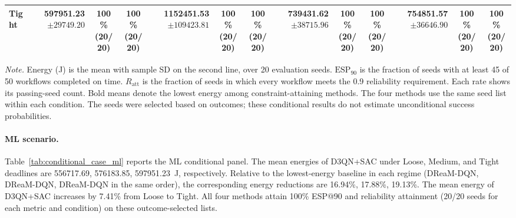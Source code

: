 \documentclass[10pt]{article}
\begin{document}
\begin{table}[!htbp]
\begin{tabular}{@{}l*{4}{rcc}@{}}
Tight & \shortstack[r]{\textbf{597951.23}\\$\pm 29749.20$} & \shortstack[c]{100\%\\(20/20)} & \shortstack[c]{100\%\\(20/20)} & \shortstack[r]{1152451.53\\$\pm 109423.81$} & \shortstack[c]{100\%\\(20/20)} & \shortstack[c]{100\%\\(20/20)} & \shortstack[r]{739431.62\\$\pm 38715.96$} & \shortstack[c]{100\%\\(20/20)} & \shortstack[c]{100\%\\(20/20)} & \shortstack[r]{754851.57\\$\pm 36646.90$} & \shortstack[c]{100\%\\(20/20)} & \shortstack[c]{100\%\\(20/20)} \\
\bottomrule
\end{tabular}
\par\vspace{3pt}
\parbox{\textwidth}{\footnotesize
\textit{Note.} Energy (J) is the mean with sample SD on the second line, over 20 evaluation seeds.
$\mathrm{ESP}_{90}$ is the fraction of seeds with at least 45 of 50 workflows completed on time.
$R_{\mathrm{att}}$ is the fraction of seeds in which every workflow meets the 0.9 reliability requirement.
Each rate shows its passing-seed count. Bold means denote the lowest energy among constraint-attaining methods.
The four methods use the same seed list within each condition.
The seeds were selected based on outcomes; these conditional results do not estimate unconditional success probabilities.}
\endgroup
\end{table}

\paragraph{ML scenario.}
Table~\ref{tab:conditional_case_ml} reports the ML conditional panel. The mean energies of D3QN+SAC under Loose, Medium, and Tight deadlines are 556717.69, 576183.85, 597951.23~J, respectively. Relative to the lowest-energy baseline in each regime (DReaM-DQN, DReaM-DQN, DReaM-DQN in the same order), the corresponding energy reductions are 16.94\%, 17.88\%, 19.13\%. The mean energy of D3QN+SAC increases by 7.41\% from Loose to Tight. All four methods attain 100\% ESP@90 and reliability attainment (20/20 seeds for each metric and condition) on these outcome-selected lists.
\clearpage
\end{document}
